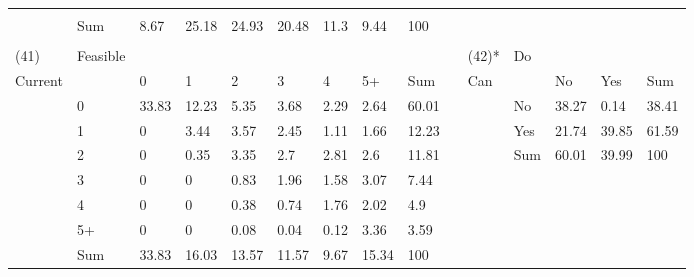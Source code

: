 \begin{center}
\begin{landscape}
\begin{longtable}{lllllllllllllll}
   &
    \\
  &
  Sum &
  8.67 &
  25.18 &
  24.93 &
  20.48 &
  11.3 &
  9.44 &
  100 &
    &
    &
    &
    &
    &
    \\
  &
    &
    &
    &
    &
    &
    &
    &
    &
    &
    &
    &
    &
    &
    \\
(41) &
  Feasible &
   &
   &
   &
   &
   &
   &
    &
   &
  (42)* &
  Do &
   &
   &
    \\
Current &
   &
  0 &
  1 &
  2 &
  3 &
  4 &
  5+ &
  Sum &
    &
  Can &
   &
  No &
  Yes &
  Sum \\
 &
  0 &
  \cellcolor[HTML]{A6A6A6}33.83 &
  \cellcolor[HTML]{DFDFDF}12.23 &
  \cellcolor[HTML]{F1F1F1}5.35 &
  \cellcolor[HTML]{F6F6F6}3.68 &
  \cellcolor[HTML]{F9F9F9}2.29 &
  \cellcolor[HTML]{F9F9F9}2.64 &
  60.01 &
   &
   &
  No &
  \cellcolor[HTML]{AAAAAA}38.27 &
  \cellcolor[HTML]{FFFFFF}0.14 &
  38.41 \\
 &
  1 &
  \cellcolor[HTML]{FFFFFF}0 &
  \cellcolor[HTML]{F6F6F6}3.44 &
  \cellcolor[HTML]{F6F6F6}3.57 &
  \cellcolor[HTML]{F9F9F9}2.45 &
  \cellcolor[HTML]{FDFDFD}1.11 &
  \cellcolor[HTML]{FBFBFB}1.66 &
  12.23 &
   &
   &
  Yes &
  \cellcolor[HTML]{CFCFCF}21.74 &
  \cellcolor[HTML]{A6A6A6}39.85 &
  61.59 \\
 &
  2 &
  \cellcolor[HTML]{FFFFFF}0 &
  \cellcolor[HTML]{FFFFFF}0.35 &
  \cellcolor[HTML]{F7F7F7}3.35 &
  \cellcolor[HTML]{F8F8F8}2.7 &
  \cellcolor[HTML]{F8F8F8}2.81 &
  \cellcolor[HTML]{F9F9F9}2.6 &
  11.81 &
   &
   &
  Sum &
  60.01 &
  39.99 &
  100 \\
 &
  3 &
  \cellcolor[HTML]{FFFFFF}0 &
  \cellcolor[HTML]{FFFFFF}0 &
  \cellcolor[HTML]{FDFDFD}0.83 &
  \cellcolor[HTML]{FAFAFA}1.96 &
  \cellcolor[HTML]{FBFBFB}1.58 &
  \cellcolor[HTML]{F7F7F7}3.07 &
  7.44 &
   &
   &
   &
   &
   &
    \\
 &
  4 &
  \cellcolor[HTML]{FFFFFF}0 &
  \cellcolor[HTML]{FFFFFF}0 &
  \cellcolor[HTML]{FFFFFF}0.38 &
  \cellcolor[HTML]{FEFEFE}0.74 &
  \cellcolor[HTML]{FBFBFB}1.76 &
  \cellcolor[HTML]{FAFAFA}2.02 &
  4.9 &
   &
   &
   &
   &
   &
    \\
 &
  5+ &
  \cellcolor[HTML]{FFFFFF}0 &
  \cellcolor[HTML]{FFFFFF}0 &
  \cellcolor[HTML]{FFFFFF}0.08 &
  \cellcolor[HTML]{FFFFFF}0.04 &
  \cellcolor[HTML]{FFFFFF}0.12 &
  \cellcolor[HTML]{F7F7F7}3.36 &
  3.59 &
   &
   &
   &
   &
   &
    \\
  &
  Sum &
  33.83 &
  16.03 &
  13.57 &
  11.57 &
  9.67 &
  15.34 &
  100 &
    &
    &
    &
    &
    &
    \\

\end{longtable}
\end{landscape}
\end{center}
